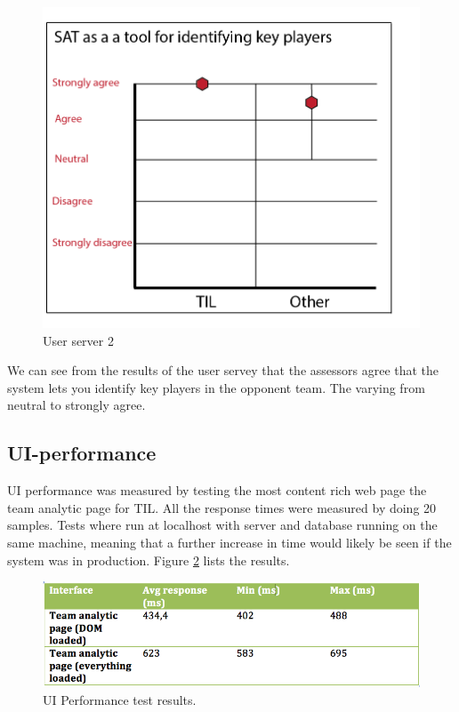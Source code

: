 \begin{figure}[ht!]
\centering
\includegraphics[width=1\textwidth]{images/evaluation/user_servery2}
\caption{User server 2}
\label{fig:user_servery2}
\end{figure}

We can see from the results of the user servey that the assessors agree that the system lets you identify key players in the opponent team. The varying from neutral to strongly agree.

\subsection{UI-performance}
UI performance was measured by testing the most content rich web page the team analytic page for \ac{TIL}. All the response times were measured by doing 20 samples. Tests where run at localhost with server and database running on the same machine, meaning that a further increase in time would likely be seen if the system was in production. Figure \ref{fig:uiperform} lists the results.

\begin{figure}[ht!]
\centering
\includegraphics[width=1\textwidth]{images/evaluation/uipeform}
\caption{UI Performance test results. }
\label{fig:uiperform}
\end{figure}

